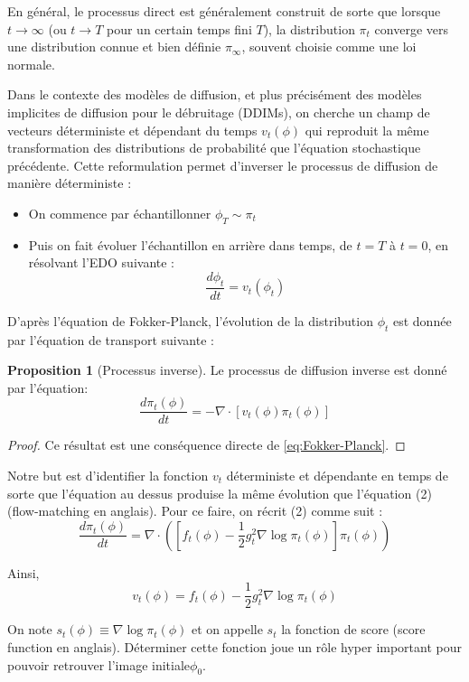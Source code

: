 \documentclass[a4paper,10pt]{article}
\theoremstyle{definition} %
\theoremstyle{definition} %
\newtheorem{proposition}[definition]{Proposition}
\theoremstyle{definition} %
\theoremstyle{definition} %
\begin{document}
En général, le processus direct est généralement construit de sorte que lorsque $t \rightarrow \infty$ (ou $t \rightarrow T$ pour un certain temps fini $T$), la distribution $\pi_t$ converge vers une distribution connue et bien définie $\pi_{\infty}$, souvent choisie comme une loi normale. 

Dans le contexte des modèles de diffusion, et plus précisément des modèles implicites de diffusion pour le débruitage (DDIMs), on cherche un champ de vecteurs déterministe et dépendant du temps $v_t(\phi)$ qui reproduit la même transformation des distributions de probabilité que l'équation stochastique précédente. Cette reformulation permet d'inverser le processus de diffusion de manière déterministe :
\begin{itemize}
    \item On commence par échantillonner $\phi_T \sim \pi_t$
    \item Puis on fait évoluer l'échantillon en arrière dans temps, de $t=T$ à $t = 0$, en résolvant l'EDO suivante :
    \begin{equation}
        \frac{d\phi_t}{dt} = v_t(\phi_t)
    \end{equation}
\end{itemize}

D'après l'équation de Fokker-Planck, l'évolution de la distribution $\phi_t$ est donnée par l'équation de transport suivante :
\begin{proposition}[Processus inverse\label{prop:fokker}] 
Le processus de diffusion inverse est donné par l'équation:
\[\frac{d\pi_t(\phi)}{dt} =-\nabla \cdot [v_t(\phi)\pi_t(\phi)]\]
\end{proposition}
\begin{proof}
    Ce résultat est une conséquence directe de \cref{eq:Fokker-Planck}.
\end{proof}

Notre but est d'identifier la fonction $v_t$ déterministe et dépendante en temps de sorte que l'équation au dessus produise la même évolution que l'équation (2) (flow-matching en anglais). Pour ce faire, on récrit (2) comme suit :
\[\frac{d\pi_t(\phi)}{dt} =\nabla \cdot([f_t(\phi)-\frac{1}{2}g_t^2\nabla \log\pi_t(\phi)]\pi_t(\phi))\]

Ainsi,
\[v_t(\phi) =f_t(\phi)-\frac{1}{2}g_t^2\nabla \log\pi_t(\phi) \]

On note $s_t(\phi) \equiv \nabla \log\pi_t(\phi)$ et on appelle $s_t$ la fonction de score (score function en anglais). Déterminer cette fonction joue un rôle hyper important pour pouvoir retrouver l'image initiale$\phi_0$. 
\end{document}
